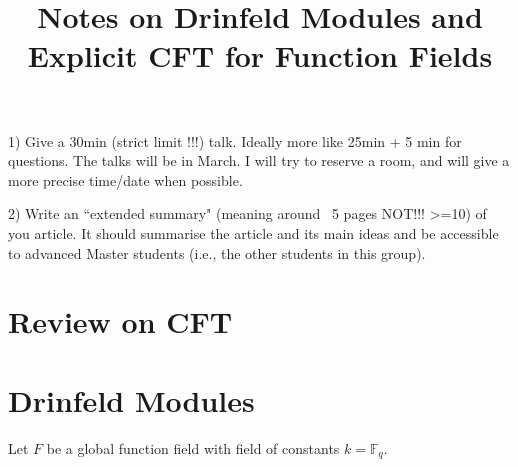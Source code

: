 \documentclass{article}
\title{Notes on Drinfeld Modules and Explicit CFT for Function Fields}
\newcommand{\F}{\mathbb{F}}
\begin{document}
\maketitle

1) Give a 30min (strict limit !!!) talk. Ideally more like 25min + 5 min for questions.  The talks will be in March. I will try to reserve a room, and will give a more precise time/date when possible.

2) Write an ``extended summary" (meaning around ~5 pages NOT!!! >=10) of you article. It should summarise the article and its main ideas and be accessible to advanced Master students (i.e., the other students in this group).

\section{Review on CFT}



\section{Drinfeld Modules}
Let $F$ be a global function field with field of constants $k = \F_q$.
\end{document}
